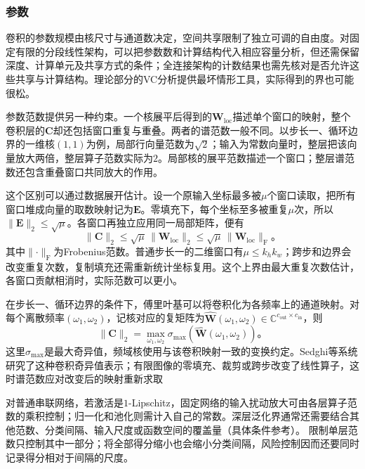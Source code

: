 \subsubsection{参数}
\label{sec:cnn-parameter-generalization}

卷积的参数规模由核尺寸与通道数决定，空间共享限制了独立可调的自由度。对固定有限的分段线性架构，可以把参数数和计算结构代入相应容量分析，但还需保留深度、计算单元及共享方式的条件；全连接架构的计数结果也需先核对是否允许这些共享与计算结构。理论部分的VC分析提供最坏情形工具，实际得到的界也可能很松。

参数范数提供另一种约束。一个核展平后得到的$\bm W_{\mathrm{loc}}$描述单个窗口的映射，整个卷积层的$\bm C$却还包括窗口重复与重叠。两者的谱范数一般不同。以步长一、循环边界的一维核$(1,1)$为例，局部行向量范数为$\sqrt2$；输入为常数向量时，整层把该向量放大两倍，整层算子范数实际为$2$。局部核的展平范数描述一个窗口；整层谱范数还包含重叠窗口共同放大的作用。

这个区别可以通过数据展开估计。设一个原输入坐标最多被$\mu$个窗口读取，把所有窗口堆成向量的取数映射记为$\bm E$。零填充下，每个坐标至多被重复$\mu$次，所以$\lVert\bm E\rVert_2\leq\sqrt\mu$。各窗口再独立应用同一局部矩阵，便有
\begin{equation}
  \lVert\bm C\rVert_2
    \leq\sqrt\mu\,\lVert\bm W_{\mathrm{loc}}\rVert_2
    \leq\sqrt\mu\,\lVert\bm W_{\mathrm{loc}}\rVert_{\mathrm F}\text{。}
  \label{eq:cnn-operator-bound}
\end{equation}
其中$\lVert\cdot\rVert_{\mathrm F}$为Frobenius范数。普通步长一的二维窗口有$\mu\leq k_hk_w$；跨步和边界会改变重复次数，复制填充还需重新统计坐标复用。这个上界由最大重复次数估计，各窗口贡献相消时，实际范数可以更小。

在步长一、循环边界的条件下，傅里叶基可以将卷积化为各频率上的通道映射。对每个离散频率$(\omega_1,\omega_2)$，记核对应的复矩阵为$\widehat{\bm W}(\omega_1,\omega_2)\in\mathbb C^{c_{\mathrm{out}}\times c_{\mathrm{in}}}$，则
\begin{equation}
  \lVert\bm C\rVert_2
    =\max_{\omega_1,\omega_2}
       \sigma_{\max}\!\left(\widehat{\bm W}(\omega_1,\omega_2)\right)\text{。}
  \label{eq:cnn-fourier-norm}
\end{equation}
这里$\sigma_{\max}$是最大奇异值，频域核使用与该卷积映射一致的变换约定。Sedghi等系统研究了这种卷积奇异值表示；有限图像的零填充、裁剪或跨步改变了线性算子，这时谱范数应对改变后的映射重新求取

对普通串联网络，若激活是$1$-Lipschitz，固定网络的输入扰动放大可由各层算子范数的乘积控制；归一化和池化则需计入自己的常数。深层泛化界通常还需要结合其他范数、分类间隔、输入尺度或函数空间的覆盖量（具体条件参考）。
限制单层范数只控制其中一部分；将全部得分缩小也会缩小分类间隔，风险控制因而还要同时记录得分相对于间隔的尺度。


